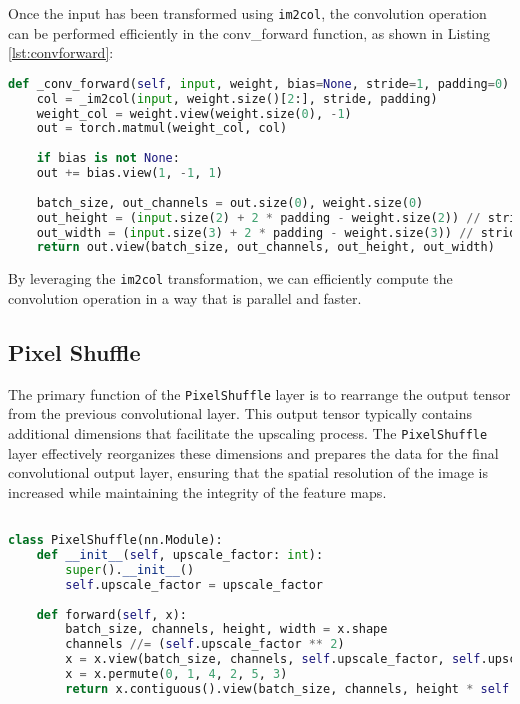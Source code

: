 \documentclass[../report.tex]{subfiles}
\begin{document}
Once the input has been transformed using \texttt{im2col}, the convolution operation can be performed efficiently in the conv\_forward function, as shown in Listing \ref{lst:convforward}:
\begin{lstlisting}[style=python, language=python, label={lst:convforward}, caption={Implementation of the forward function}]
	def _conv_forward(self, input, weight, bias=None, stride=1, padding=0):
	col = _im2col(input, weight.size()[2:], stride, padding)
	weight_col = weight.view(weight.size(0), -1)
	out = torch.matmul(weight_col, col)
	
	if bias is not None:
	out += bias.view(1, -1, 1)
	
	batch_size, out_channels = out.size(0), weight.size(0)
	out_height = (input.size(2) + 2 * padding - weight.size(2)) // stride + 1
	out_width = (input.size(3) + 2 * padding - weight.size(3)) // stride + 1
	return out.view(batch_size, out_channels, out_height, out_width)
\end{lstlisting}
By leveraging the \texttt{im2col} transformation, we can efficiently compute the convolution operation in a way that is parallel and faster.

	\subsection{Pixel Shuffle}
	The primary function of the \texttt{PixelShuffle} layer is to rearrange the output tensor from the previous convolutional layer. This output tensor typically contains additional dimensions that facilitate the upscaling process. The \texttt{PixelShuffle} layer effectively reorganizes these dimensions and prepares the data for the final convolutional output layer, ensuring that the spatial resolution of the image is increased while maintaining the integrity of the feature maps.
	
	\begin{lstlisting}[style=python, language=python, label={lst:PixelShuffle}, caption={Implementation of the PixelShuffle class}]

class PixelShuffle(nn.Module):
	def __init__(self, upscale_factor: int):
		super().__init__()
		self.upscale_factor = upscale_factor
	
	def forward(self, x):
		batch_size, channels, height, width = x.shape
		channels //= (self.upscale_factor ** 2)
		x = x.view(batch_size, channels, self.upscale_factor, self.upscale_factor, height, width)
		x = x.permute(0, 1, 4, 2, 5, 3)
		return x.contiguous().view(batch_size, channels, height * self.upscale_factor, width * self.upscale_factor)
	\end{lstlisting}
\end{document}
